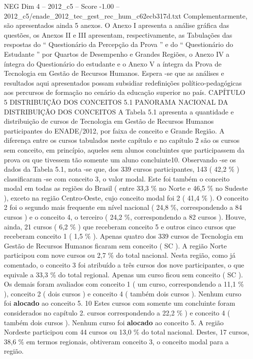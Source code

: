 \begin{textsample}{NEG Dim 4 – 2012\_c5 – Score -1.00 – 2012\_c5/enade\_2012\_tec\_gest\_rec\_hum\_c62ecb317d.txt}
Complementarmente, são apresentados ainda 5 anexos.
O Anexo I apresenta a análise gráfica das questões, os Anexos II e III apresentam, respectivamente, as Tabulações das respostas do “ Questionário da Percepção da Prova ” e do “ Questionário do Estudante ” por Quartos de Desempenho e Grandes Regiões, o Anexo IV a íntegra do Questionário do estudante e o Anexo V a íntegra da Prova de Tecnologia em Gestão de Recursos Humanos.
Espera -se que as análises e resultados aqui apresentados possam subsidiar redefinições político-pedagógicas aos percursos de formação no cenário da educação superior no país.
CAPÍTULO 5 DISTRIBUIÇÃO DOS CONCEITOS 5.1 PANORAMA NACIONAL DA DISTRIBUIÇÃO DOS CONCEITOS A Tabela 5.1 apresenta a quantidade e distribuição de cursos de Tecnologia em Gestão de Recursos Humanos participantes do ENADE/2012, por faixa de conceito e Grande Região.
A diferença entre os cursos tabulados neste capítulo e no capítulo 2 são os cursos sem conceito, em princípio, aqueles sem alunos concluintes que participassem da prova ou que tivessem tão somente um aluno concluinte10.
Observando -se os dados da Tabela 5.1, nota -se que, dos 339 cursos participantes, 143 ( 42,2 \% ) classificaram -se com conceito 3, o valor modal.
Este foi também o conceito modal em todas as regiões do Brasil ( entre 33,3 \% no Norte e 46,5 \% no Sudeste ), exceto na região Centro-Oeste, cujo conceito modal foi 2 ( 41,4 \% ).
O conceito 2 foi o segundo mais frequente em nível nacional ( 24,8 \%, correspondendo a 84 cursos ) e o conceito 4, o terceiro ( 24,2 \%, correspondendo a 82 cursos ).
Houve, ainda, 21 cursos ( 6,2 \% ) que receberam conceito 5 e outros cinco cursos que receberam conceito 1 ( 1,5 \% ).
Apenas quatro dos 339 cursos de Tecnologia em Gestão de Recursos Humanos ficaram sem conceito ( SC ).
A região Norte participou com nove cursos ou 2,7 \% do total nacional.
Nesta região, como já comentado, o conceito 3 foi atribuído a três cursos dos nove participantes, o que equivale a 33,3 \% do total regional.
Apenas um curso ficou sem conceito ( SC ).
Os demais foram avaliados com conceito 1 ( um curso, correspondendo a 11,1 \% ), conceito 2 ( dois cursos ) e conceito 4 ( também dois cursos ).
Nenhum curso foi \textbf{alocado} ao conceito 5. 10 Estes cursos com somente um concluinte foram considerados no capítulo 2. cursos correspondendo a 22,2 \% ) e conceito 4 ( também dois cursos ).
Nenhum curso foi \textbf{alocado} ao conceito 5.
A região Nordeste participou com 44 cursos ou 13,0 \% do total nacional.
Destes, 17 cursos, 38,6 \% em termos regionais, obtiveram conceito 3, o conceito modal para a região.

\end{textsample}
